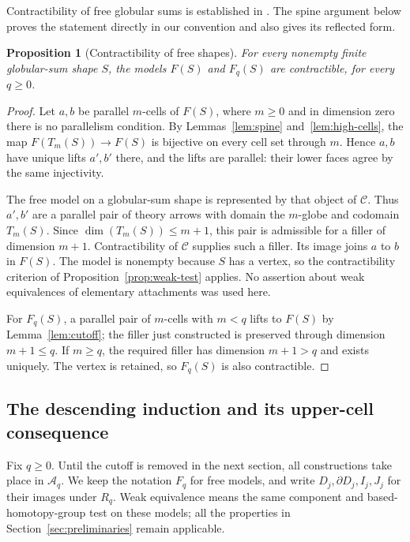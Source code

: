 \documentclass[11pt,letterpaper]{article}
\numberwithin{equation}{section}
\theoremstyle{plain}
\newtheorem{proposition}[theorem]{Proposition}
\theoremstyle{definition}
\theoremstyle{remark}
\begin{document}
Contractibility of free globular sums is established in
\cite[Proposition~3.8]{Lanari2020}.  The spine argument below proves
the statement directly in our convention and also gives its reflected form.

\begin{proposition}[Contractibility of free shapes]
\label{prop:shape-contractible}
For every nonempty finite globular-sum shape $S$, the models $F(S)$
and $F_q(S)$ are contractible, for every $q\geq0$.
\end{proposition}

\begin{proof}
Let $a,b$ be parallel $m$-cells of $F(S)$, where $m\geq0$ and in
dimension zero there is no parallelism condition.  By
Lemmas~\ref{lem:spine} and~\ref{lem:high-cells}, the map
$F(T_m(S))\to F(S)$ is bijective on every cell set through $m$.
Hence $a,b$ have unique lifts $a',b'$ there, and the lifts are
parallel: their lower faces agree by the same injectivity.

The free model on a globular-sum shape is represented by that
object of $\mathcal C$.  Thus $a',b'$ are a parallel pair of theory
arrows with domain the $m$-globe and codomain $T_m(S)$.
Since $\dim(T_m(S))\leq m+1$, this pair is admissible for a filler
of dimension $m+1$.  Contractibility of $\mathcal C$ supplies such a
filler.  Its image joins $a$ to $b$ in $F(S)$.
The model is nonempty because $S$ has a vertex, so the
contractibility criterion of Proposition~\ref{prop:weak-test}
applies.  No assertion about weak equivalences of elementary
attachments was used here.

For $F_q(S)$, a parallel pair of $m$-cells with $m<q$ lifts to
$F(S)$ by Lemma~\ref{lem:cutoff}; the filler just constructed is
preserved through dimension $m+1\leq q$.  If $m\geq q$, the
required filler has dimension $m+1>q$ and exists uniquely.  The
vertex is retained, so $F_q(S)$ is also contractible.
\end{proof}

\subsection{The descending induction and its upper-cell consequence}

Fix $q\geq0$.  Until the cutoff is removed in the next section,
all constructions take place in $\mathcal A_q$.  We keep the notation
$F_q$ for free models, and write $D_j,\partial D_j,I_j,J_j$ for
their images under $R_q$.  Weak equivalence means the same
component and based-homotopy-group test on these models; all the
properties in Section~\ref{sec:preliminaries} remain applicable.
\end{document}
